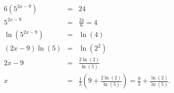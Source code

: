 \begin{eqnarray*}
	6(5^{2x-9}) & = & 24\\
	5^{2x-9} & = & \frac{24}{6}=4\\
	\ln(5^{2x-9}) & = & \ln(4)\\
	(2x-9)\ln(5) & = & \ln(2^2)\\
	2x-9 & = & \frac{2\ln(2)}{\ln(5)}\\
	x & = & \frac{1}{2}\left(9+\frac{2\ln(2)}{\ln(5)}\right) = \frac{9}{2}+\frac{\ln(2)}{\ln(5)}.
\end{eqnarray*}

